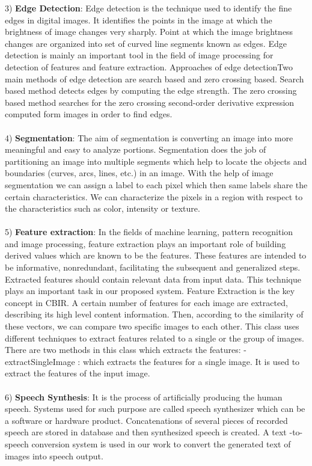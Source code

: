 \documentclass{article}
\begin{document}
3) \textbf{Edge Detection}: Edge detection is the technique used to
identify the fine edges in digital images. It identifies the points
in the image at which the brightness of image changes very
sharply. Point at which the image brightness changes are
organized into set of curved line segments known as edges. Edge
detection is mainly an important tool in the field of image
processing for detection of features and feature extraction.
Approaches of edge detectionTwo
main methods of edge detection are search based and zero
crossing based. Search based method detects edges by
computing the edge strength. The zero crossing based method
searches for the zero crossing second-order derivative expression
computed form images in order to find edges.\\\\
4) \textbf{Segmentation}: The aim of segmentation is converting an
image into more meaningful and easy to analyze portions.
Segmentation does the job of partitioning an image into multiple
segments which help to locate the objects and boundaries
(curves, arcs, lines, etc.) in an image. With the help of image
segmentation we can assign a label to each pixel which then
same labels share the certain characteristics. We can characterize
the pixels in a region with respect to the characteristics such as
color, intensity or texture.\\\\
5) \textbf{Feature extraction}: In the fields of machine learning, pattern
recognition and image processing, feature extraction plays an
important role of building derived values which are known to be
the features. These features are intended to be informative, nonredundant,
facilitating the subsequent and generalized steps.
Extracted features should contain relevant data from input data.
This technique plays an important task in our proposed system.
Feature Extraction is the key concept in CBIR. A certain number
of features for each image are extracted, describing its high level
content information. Then, according to the similarity of these
vectors, we can compare two specific images to each other. This
class uses different techniques to extract features related to a
single or the group of images. There are two methods in this
class which extracts the features:
 - extractSingleImage : which extracts the features for a single
image. It is used to extract the features of the input image.\\\\
6) \textbf{Speech Synthesis}: It is the process of artificially producing
the human speech. Systems used for such purpose are called
speech synthesizer which can be a software or hardware product.
Concatenations of several pieces of recorded speech are stored in
database and then synthesized speech is created.
A text -to-speech conversion system is used in our work to
convert the generated text of images into speech output. 
\newpage
\end{document}
